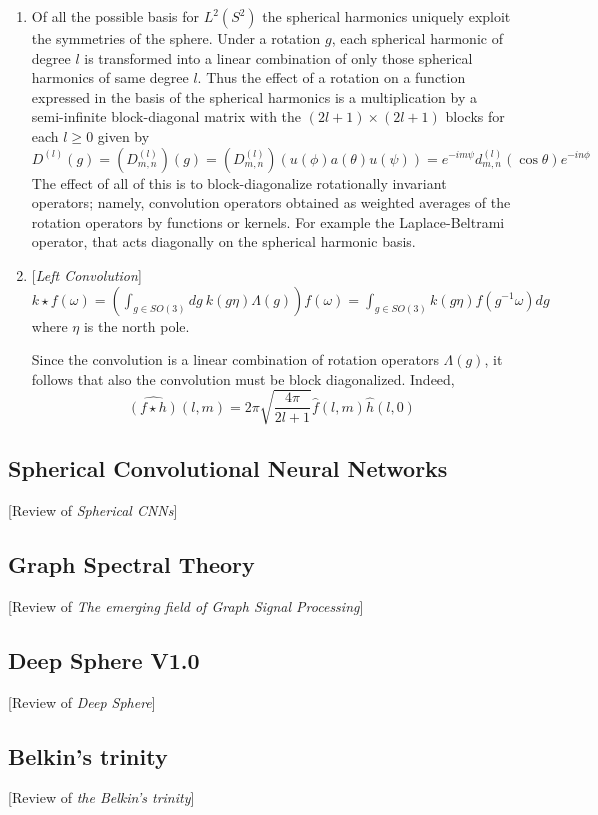 \begin{enumerate}
	\item Of all the possible basis for $L^2(S^2)$ the spherical harmonics uniquely exploit the symmetries of the sphere. Under a rotation $g$, each spherical harmonic of degree $l$ is transformed into a linear combination of only those spherical harmonics of same degree $l$.
	Thus the effect of a rotation on a function expressed in the basis of the spherical harmonics is a multiplication by a semi-infinite block-diagonal matrix with the $(2l+1)\times(2l+1)$ blocks for each $l \geq 0$ given by $$D^{(l)}(g) = \left(D^{(l)}_{m,n}\right) (g) =  \left(D^{(l)}_{m,n}\right)(u(\phi)a(\theta)u(\psi)) = e^{-im\psi}d^{(l)}_{m,n}(\cos \theta) e^{-in\phi}$$
	The effect of all of this is to block-diagonalize rotationally invariant operators; namely, convolution operators obtained as weighted averages of the rotation operators by functions or kernels. For example the Laplace-Beltrami operator, that acts diagonally on the spherical harmonic basis.
	\item \begin{definition}{[\textit{Left Convolution}]}\\
		$k\star f(\omega) = \left(\int_{g\in SO(3)}dg\ k(g\eta)\Lambda(g)\right)f(\omega) = \int_{g\in SO(3)}k(g\eta)f(g^{-1}\omega)dg$
		where $\eta$ is the north pole. 
	\end{definition}
	Since the convolution is a linear combination of rotation operators $\Lambda(g)$, it follows that also the convolution must be block diagonalized. Indeed,
	$$\hat {(f \star h)}(l,m) = 2\pi \sqrt{\frac{4\pi}{2l+1}}\hat f(l,m) \hat h(l,0) $$

\end{enumerate}

\subsection{Spherical Convolutional Neural Networks}
[Review of \textit{Spherical CNNs}]
\subsection{Graph Spectral Theory} \label{sec:Chapter1: Spectral Graph Theory}
[Review of \textit{The emerging field of Graph Signal Processing}]
\subsection{Deep Sphere V1.0}
[Review of \textit{Deep Sphere}]
\subsection{Belkin's trinity}
[Review of \textit{the Belkin's trinity}]

